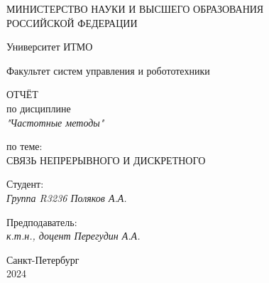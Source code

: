 \thispagestyle{empty}

\begin{center}
    МИНИСТЕРСТВО НАУКИ И ВЫСШЕГО ОБРАЗОВАНИЯ \\ РОССИЙСКОЙ ФЕДЕРАЦИИ

    \vspace{20pt}

    Университет ИТМО

    \vspace{20pt}

    Факультет систем управления и робототехники
\end{center}

\vfill

\begin{center}
    ОТЧЁТ \\  
    по дисциплине \\
    \textit{"Частотные методы"}

    \vspace{20pt}

    по теме: \\
    \uppercase{Связь непрерывного и дискретного}
\end{center}

\vfill

    \noindent Студент: \\
    \textit{Группа R3236 \hfill Поляков А.А.}

    \vspace{20pt}

    \noindent Предподаватель: \\
    \textit{к.т.н., доцент \hfill Перегудин А.А.}

\vfill

\begin{center}
    Санкт-Петербург \\ 2024
\end{center}